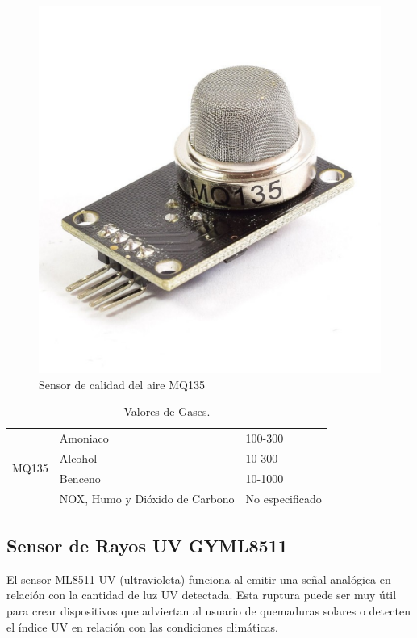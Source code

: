 \documentclass[10pt,a4paper]{article}
\begin{document}
\begin{multicols}{2}
\begin{itemize}
\begin{figure}[H]
\centering
\includegraphics[scale=0.3]{mq35.PNG}
\caption{Sensor de calidad del aire MQ135}
\end{figure}


\begin{table}[H]
\centering
\begin{tabular}{|l|l|l|}
\hline
\multirow{4}{1cm}{MQ135} & Amoniaco & 100-300 \\ \cline{2-3}
& Alcohol & 10-300 \\ \cline{2-3}
& Benceno & 10-1000 \\ \cline{2-3}
& NOX, Humo y Dióxido de Carbono & No especificado \\ 
\cline{1-3}
\end{tabular}
\caption{Valores de Gases.}
\label{tabla:final}
\end{table}


\subsection{Sensor de Rayos UV GYML8511}
El sensor ML8511 UV (ultravioleta) funciona al emitir una señal analógica en relación con la cantidad de luz UV detectada. Esta ruptura puede ser muy útil para crear dispositivos que adviertan al usuario de quemaduras solares o detecten el índice UV en relación con las condiciones climáticas. \\



\end{itemize}
\end{multicols}
\end{document}
